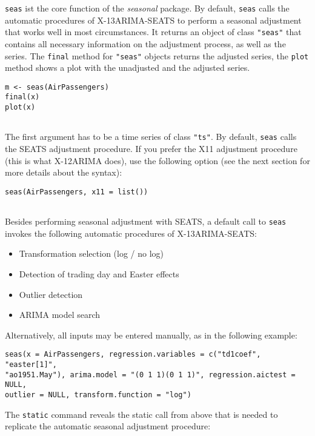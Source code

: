 \texttt{seas} ist the core function of the \emph{seasonal} package. By
default, \texttt{seas} calls the automatic procedures of X-13ARIMA-SEATS
to perform a seasonal adjustment that works well in most circumstances.
It returns an object of class \texttt{"seas"} that contains all
necessary information on the adjustment process, as well as the series.
The \texttt{final} method for \texttt{"seas"} objects returns the
adjusted series, the \texttt{plot} method shows a plot with the
unadjusted and the adjusted series.

\begin{verbatim}
m <- seas(AirPassengers)
final(x)
plot(x)
 
\end{verbatim}

The first argument has to be a time series of class \texttt{"ts"}. By
default, \texttt{seas} calls the SEATS adjustment procedure. If you
prefer the X11 adjustment procedure (this is what X-12ARIMA does), use
the following option (see the next section for more details about the
syntax):

\begin{verbatim}
seas(AirPassengers, x11 = list())
 
\end{verbatim}

Besides performing seasonal adjustment with SEATS, a default call to
\texttt{seas} invokes the following automatic procedures of
X-13ARIMA-SEATS:

\begin{itemize}
\itemsep1pt\parskip0pt
\item
  Transformation selection (log / no log)
\item
  Detection of trading day and Easter effects
\item
  Outlier detection
\item
  ARIMA model search
\end{itemize}

Alternatively, all inputs may be entered manually, as in the following
example:

\begin{verbatim}
seas(x = AirPassengers, regression.variables = c("td1coef", "easter[1]",
"ao1951.May"), arima.model = "(0 1 1)(0 1 1)", regression.aictest = NULL,
outlier = NULL, transform.function = "log")
\end{verbatim}

The \texttt{static} command reveals the static call from above that is
needed to replicate the automatic seasonal adjustment procedure:

